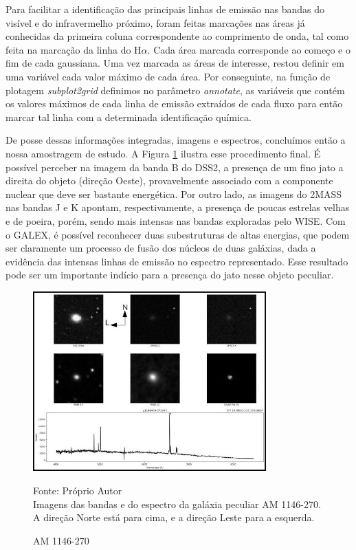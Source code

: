 Para facilitar a identificação das principais linhas de emissão nas bandas do visível e do infravermelho próximo, foram feitas marcações nas áreas já conhecidas da primeira coluna correspondente ao comprimento de onda, tal como feita na marcação da linha do H$\alpha$. Cada área marcada corresponde ao começo e o fim de cada gaussiana. Uma vez marcada as áreas de interesse, restou definir em uma variável cada valor máximo de cada área. Por conseguinte, na função de plotagem \textit{subplot2grid} definimos no parâmetro \textit{annotate}, as variáveis que contém os valores máximos de cada linha de emissão extraídos de cada fluxo para então marcar tal linha com a determinada identificação química.

De posse dessas informações integradas, imagens e espectros, concluímos então a nossa amostragem de estudo. A Figura \ref{fig:1146-270} ilustra esse procedimento final. É possível perceber na imagem da banda B do DSS2, a presença de um fino jato a direita do objeto (direção Oeste), provavelmente associado com a componente nuclear que deve ser bastante energética. Por outro lado, as imagens do 2MASS nas bandas J e K apontam, respectivamente, a presença de poucas estrelas velhas e de poeira, porém, sendo mais intensas nas bandas exploradas pelo WISE. Com o GALEX, é possível reconhecer duas subestruturas de altas energias, que podem ser claramente um processo de fusão dos núcleos de duas galáxias, dada a evidência das intensas linhas de emissão no espectro representado. Esse resultado pode ser um importante indício para a presença do jato nesse objeto peculiar.

\begin{figure}[H]
	\centering	
    \caption{AM 1146-270}
    \includegraphics[width=0.8\textwidth]{figuras/g1148464-272245.jpg}
   	\begin{center}
        \normalsize Fonte: Próprio Autor \\Imagens das bandas e do espectro da galáxia peculiar AM 1146-270. A direção Norte está para cima, e a direção Leste para a esquerda.
    \end{center}
	\label{fig:1146-270}
\end{figure}

